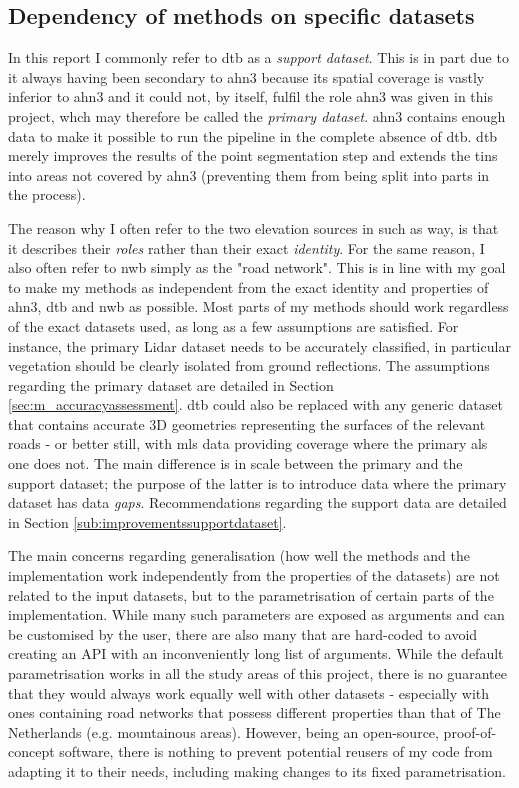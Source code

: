 \subsection{Dependency of methods on specific datasets}
\label{sub:m_generalisation}

In this report I commonly refer to \ac{dtb} as a \textit{support dataset}. This is in part due to it always having been secondary to \ac{ahn3} because its spatial coverage is vastly inferior to \ac{ahn3} and it could not, by itself, fulfil the role \ac{ahn3} was given in this project, whch may therefore be called the \textit{primary dataset}. \ac{ahn3} contains enough data to make it possible to run the pipeline in the complete absence of \ac{dtb}. \ac{dtb} merely improves the results of the point segmentation step and extends the \ac{tin}s into areas not covered by \ac{ahn3} (preventing them from being split into parts in the process).

The reason why I often refer to the two elevation sources in such as way, is that it describes their \textit{roles} rather than their exact \textit{identity}. For the same reason, I also often refer to \ac{nwb} simply as the "road network". This is in line with my goal to make my methods as independent from the exact identity and properties of \ac{ahn3}, \ac{dtb} and \ac{nwb} as possible. Most parts of my methods should work regardless of the exact datasets used, as long as a few assumptions are satisfied. For instance, the primary Lidar dataset needs to be accurately classified, in particular vegetation should be clearly isolated from ground reflections. The assumptions regarding the primary dataset are detailed in Section \ref{sec:m_accuracyassessment}. \ac{dtb} could also be replaced with any generic dataset that contains accurate 3D geometries representing the surfaces of the relevant roads - or better still, with \ac{mls} data providing coverage where the primary \ac{als} one does not. The main difference is in scale between the primary and the support dataset; the purpose of the latter is to introduce data where the primary dataset has data \textit{gaps}. Recommendations regarding the support data are detailed in Section \ref{sub:improvementssupportdataset}.

The main concerns regarding generalisation (how well the methods and the implementation work independently from the properties of the datasets) are not related to the input datasets, but to the parametrisation of certain parts of the implementation. While many such parameters are exposed as arguments and can be customised by the user, there are also many that are hard-coded to avoid creating an API with an inconveniently long list of arguments. While the default parametrisation works in all the study areas of this project, there is no guarantee that they would always work equally well with other datasets - especially with ones containing road networks that possess different properties than that of The Netherlands (e.g. mountainous areas). However, being an open-source, proof-of-concept software, there is nothing to prevent potential reusers of my code from adapting it to their needs, including making changes to its fixed parametrisation.

